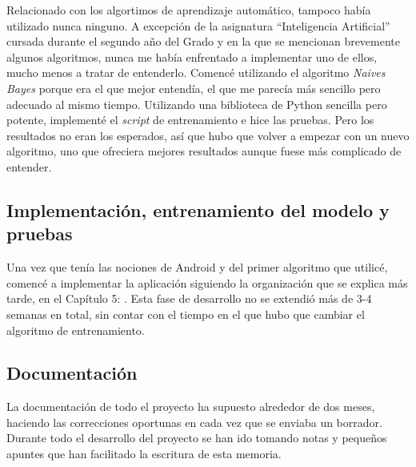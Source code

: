 Relacionado con los algortimos de aprendizaje automático, tampoco había utilizado nunca ninguno. A excepción de la asignatura ``Inteligencia Artificial'' cursada durante el segundo año del Grado y en la que se mencionan brevemente algunos algoritmos, nunca me había enfrentado a implementar uno de ellos, mucho menos a tratar de entenderlo. Comencé utilizando el algoritmo \textit{Naives Bayes} porque era el que mejor entendía, el que me parecía más sencillo pero adecuado al mismo tiempo. Utilizando una biblioteca de Python sencilla pero potente, implementé el \textit{script} de entrenamiento e hice las pruebas. Pero los resultados no eran los esperados, así que hubo que volver a empezar con un nuevo algoritmo, uno que ofreciera mejores resultados aunque fuese más complicado de entender.

\subsection{Implementación, entrenamiento del modelo y pruebas}

Una vez que tenía las nociones de Android y del primer algoritmo que utilicé, comencé a implementar la aplicación siguiendo la organización que se explica más tarde, en el Capítulo 5: \textit{}. Esta fase de desarrollo no se extendió más de 3-4 semanas en total, sin contar con el tiempo en el que hubo que cambiar el algoritmo de entrenamiento.

\subsection{Documentación}

La documentación de todo el proyecto ha supuesto alrededor de dos meses, haciendo las correcciones oportunas en cada vez que se enviaba un borrador. Durante todo el desarrollo del proyecto se han ido tomando notas y pequeños apuntes que han facilitado la escritura de esta memoria.